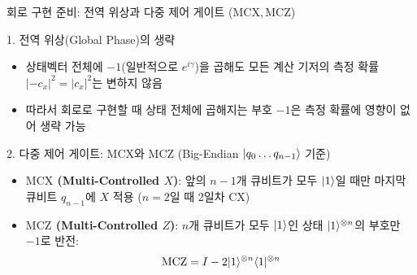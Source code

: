 \documentclass[aspectratio=169, 10pt]{beamer}
\begin{document}
\begin{frame}{회로 구현 준비: 전역 위상과 다중 제어 게이트 ($\mathrm{MCX}, \mathrm{MCZ}$)}
    \begin{qcblock}{1. 전역 위상(Global Phase)의 생략}
        \begin{itemize}
            \item 상태벡터 전체에 $-1$(일반적으로 $e^{i\gamma}$)을 곱해도 모든 계산 기저의 측정 확률 $|-c_x|^2 = |c_x|^2$는 변하지 않음
            \pause
            \item 따라서 회로로 구현할 때 상태 전체에 곱해지는 부호 $-1$은 측정 확률에 영향이 없어 생략 가능
        \end{itemize}
    \end{qcblock}
    \pause
    \vspace{0.08cm}
    \begin{qctip}{2. 다중 제어 게이트: $\mathrm{MCX}$와 $\mathrm{MCZ}$ (Big-Endian $|q_0 \dots q_{n-1}\rangle$ 기준)}
        \begin{itemize}
            \item \textbf{$\mathrm{MCX}$ (Multi-Controlled $X$)}: 앞의 $n-1$개 큐비트가 모두 $|1\rangle$일 때만 마지막 큐비트 $q_{n-1}$에 $X$ 적용 ($n=2$일 때 2일차 $\mathrm{CX}$)
            \pause
            \item \textbf{$\mathrm{MCZ}$ (Multi-Controlled $Z$)}: $n$개 큐비트가 모두 $|1\rangle$인 상태 $|1\rangle^{\otimes n}$의 부호만 $-1$로 반전:
            $$\mathrm{MCZ} = I - 2|1\rangle^{\otimes n}\langle1|^{\otimes n}$$
        \end{itemize}
    \end{qctip}
\end{frame}
\end{document}
